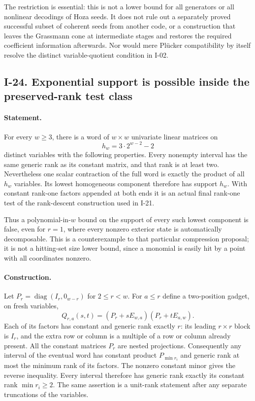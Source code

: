 The restriction is essential: this is not a lower bound for
all generators or all nonlinear decodings of Hoza seeds.
It does not rule out a separately proved successful subset
of coherent seeds from another code, or a construction that
leaves the Grassmann cone at intermediate stages and restores
the required coefficient information afterwards.  Nor would
mere Pl\"ucker compatibility by itself resolve the distinct
variable-quotient condition in I-02.


\subsection{I-24. Exponential support is possible inside the preserved-rank test class}
\label{I-24}

\paragraph{Statement.}
For every $w\ge3$, there is a word of $w\times w$ univariate
linear matrices on
\[
 h_w=3\cdot2^{w-2}-2
 \tag{I.30}\label{eq:I-reset-support}
\]
distinct variables with the following properties.  Every
nonempty interval has the same generic rank as its constant
matrix, and that rank is at least two.  Nevertheless one scalar
contraction of the full word is exactly the product of all
$h_w$ variables.  Its lowest homogeneous component therefore
has support $h_w$.  With constant rank-one factors appended
at both ends it is an actual final rank-one test of the
rank-descent construction used in I-21.

Thus a polynomial-in-$w$ bound on the support of every such
lowest component is false, even for $r=1$, where every nonzero
exterior state is automatically decomposable.  This is a
counterexample to that particular compression proposal;
it is not a hitting-set size lower bound, since a monomial is
easily hit by a point with all coordinates nonzero.

\paragraph{Construction.}
Let $P_r=\operatorname{diag}(I_r,0_{w-r})$ for $2\le r<w$.
For $a\le r$ define a two-position gadget, on fresh variables,
\[
 Q_{r,a}(s,t)=(P_r+sE_{w,a})(P_r+tE_{a,w}).
\]
Each of its factors has constant and generic rank exactly $r$:
its leading $r\times r$ block is $I_r$, and the extra row or
column is a multiple of a row or column already present.
All the constant matrices $P_r$ are nested projections.
Consequently any interval of the eventual word has constant
product $P_{\min r_i}$ and generic rank at most the minimum
rank of its factors.  The nonzero constant minor gives the
reverse inequality.  Every interval therefore has generic
rank exactly its constant rank $\min r_i\ge2$.
The same assertion is a unit-rank statement after any separate
truncations of the variables.

